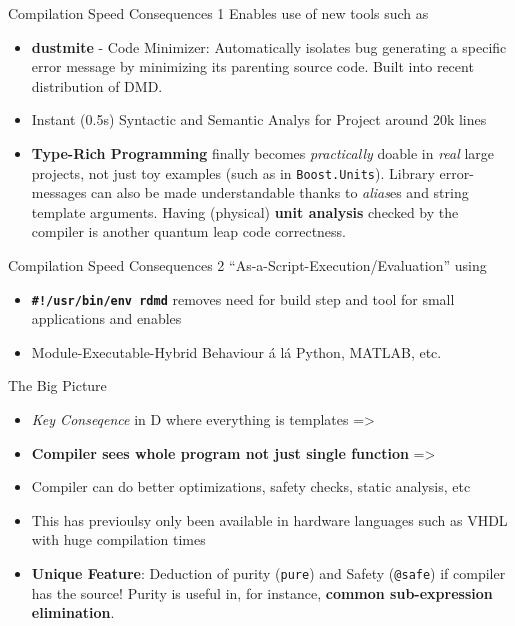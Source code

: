 \documentclass[xcolor=dvipsnames]{beamer}
\begin{document}
\begin{frame}[fragile]{Compilation Speed Consequences 1}
  Enables use of new tools such as
  \begin{itemize}[<+->]
  \item \textbf{dustmite} - Code Minimizer: Automatically isolates bug
    generating a specific error message by minimizing its parenting source
    code. Built into recent distribution of DMD.
  \item Instant (0.5s) Syntactic and Semantic Analys for Project around 20k lines
  \item \textbf{Type-Rich Programming} finally becomes \emph{practically} doable
    in \emph{real} large projects, not just toy examples (such as in
    \texttt{Boost.Units}). Library error-messages can also be made
    understandable thanks to \emph{alias}es and string template
    arguments. Having (physical) \textbf{unit analysis} checked by the compiler
    is another quantum leap code correctness.
  \end{itemize}
\end{frame}

\begin{frame}[fragile]{Compilation Speed Consequences 2}
  “As-a-Script-Execution/Evaluation” using
  \begin{itemize}[<+->]
  \item \textbf{\texttt{\#!/usr/bin/env rdmd}} removes need for build step
    and tool for small applications and enables
  \item Module-Executable-Hybrid Behaviour á lá Python, MATLAB, etc.
  \end{itemize}
\end{frame}

\begin{frame}[fragile]{The Big Picture}
  \begin{itemize}[<+->]
  \item \emph{Key Conseqence} in D where everything is templates =>
  \item \textbf{Compiler sees whole program not just single function} =>
  \item Compiler can do better optimizations, safety checks, static analysis,
    etc
  \item This has previoulsy only been available in hardware languages such as
    VHDL with huge compilation times
  \item \textbf{Unique Feature}: Deduction of purity (\texttt{pure}) and Safety
    (\texttt{@safe}) if compiler has the source! Purity is useful in, for
    instance, \textbf{common sub-expression elimination}.
  \end{itemize}
\end{frame}
\end{document}
